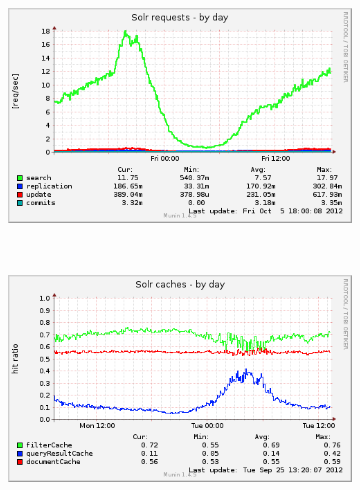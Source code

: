 \documentclass[10pt,a4paper]{article}
\begin{document}
\begin{figure}
        \centering
        \begin{subfigure}[b]{0.49\textwidth}
                \centering
                \includegraphics[width=\textwidth]{solr_users_reqs-day}
                \label{fig:solr_users_reqs-day}
        \end{subfigure}%
        ~ %
        \begin{subfigure}[b]{0.49\textwidth}
                \centering
                \includegraphics[width=\textwidth]{solr_users_cache-day}
                \label{fig:solr_users_cache-day}
        \end{subfigure}
        
        \label{fig:animals}
        

\end{figure}
\end{document}
